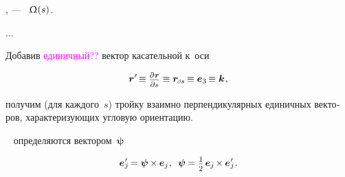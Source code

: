 \vspace{-0.2em}\noindent
{}   , \:--- ~${\Upomega(s)}$.

...

\begin{otherlanguage}{russian}

Добавив \textcolor{magenta}{единичный??} вектор касательной к~оси

\nopagebreak\vspace{-0.2em}\begin{equation*}
\locationvector{\hspace{.1ex}'} \hspace{-0.3ex}
\equiv \scalebox{.8}{$ \displaystyle\frac{\raisemath{-0.15em}{\partial \hspace{.15ex} \locationvector}}{\partial s} $}
\equiv \locationvector_\differentialindex{s} \hspace{-0.2ex}
\equiv \bm{e}_3 \hspace{-0.2ex}
\equiv \bm{k}
\hspace{.15ex} ,
\end{equation*}

\vspace{-0.1em}\noindent
получим (для каждого~$s$) тройку взаимно перпендикулярных единичных векторов, характеризующих угловую ориентацию.

 ~  определяются вектором~$\bm{\psi}$

\nopagebreak\vspace{-0.2em}\begin{equation}
\bm{e}{\hspace{.1ex}'}_{\hspace{-0.7ex}j} \hspace{-0.2ex}
= \bm{\psi} \hspace{-0.1ex} \times \hspace{-0.1ex} \bm{e}_{j}
\hspace{.1ex} , \hspace{.5em}
\bm{\psi} \hspace{-0.1ex} = \smalldisplaystyleonehalf \hspace{.25ex} \bm{e}_{j} \hspace{-0.2ex} \times \hspace{-0.1ex} \bm{e}{\hspace{.1ex}'}_{\hspace{-0.7ex}j}
\hspace{.1ex} .
\end{equation}


\end{otherlanguage}

